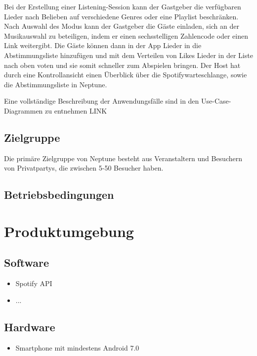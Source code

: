 \documentclass[oneside, ngerman]{sdqtechreport}
\begin{document}
Bei der Erstellung einer Listening-Session kann der Gastgeber die verfügbaren Lieder nach Belieben auf verschiedene Genres oder eine Playlist beschränken. Nach Auswahl des Modus kann der Gastgeber die Gäste einladen, sich an der Musikauswahl zu beteiligen, indem er einen sechsstelligen Zahlencode oder einen Link weitergibt. Die Gäste können dann in der App Lieder in die Abstimmungsliste hinzufügen und mit dem Verteilen von Likes Lieder in der Liste nach oben voten und sie somit schneller zum Abspielen bringen. Der Host hat durch eine Kontrollansicht einen Überblick über die Spotifywarteschlange, sowie die Abstimmungsliste in Neptune. 

Eine vollständige Beschreibung der Anwendungsfälle sind in den Use-Case-Diagrammen zu entnehmen   LINK 

\section{Zielgruppe}
\label{sec:Produkteinsatz:Zielgruppe}
\textbf{}
Die primäre Zielgruppe von Neptune besteht aus Veranstaltern und Besuchern von Privatpartys, die zwischen 5-50 Besucher haben.  


\section{Betriebsbedingungen}
\label{sec:Produkteinsatz:Betriebsbedingungen}



\chapter{Produktumgebung}
\label{chap:Produktumgebung}

\section{Software}
\label{sec:Produktumgebung:Software}

\begin{itemize}
    \item Spotify API
    \item ...
\end{itemize}

\section{Hardware}
\label{sec:Produktumgebung:Hardware}

\begin{itemize}
    \item Smartphone mit mindestens Android 7.0
\end{itemize}
\end{document}

